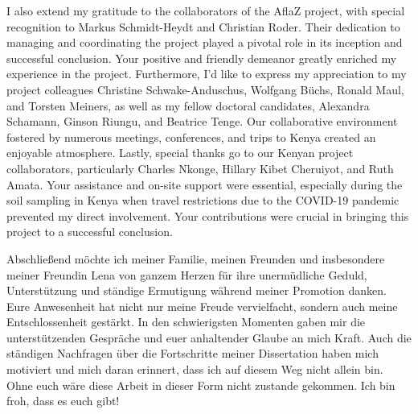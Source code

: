 \begin{acknowledgements}
I also extend my gratitude to the collaborators of the AflaZ project, with special recognition to Markus Schmidt-Heydt and Christian Roder. Their dedication to managing and coordinating the project played a pivotal role in its inception and successful conclusion. Your positive and friendly demeanor greatly enriched my experience in the project. Furthermore, I'd like to express my appreciation to my project colleagues Christine Schwake-Anduschus, Wolfgang Büchs, Ronald Maul, and Torsten Meiners, as well as my fellow doctoral candidates, Alexandra Schamann, Ginson Riungu, and Beatrice Tenge. Our collaborative environment fostered by numerous meetings, conferences, and trips to Kenya created an enjoyable atmosphere. Lastly, special thanks go to our Kenyan project collaborators, particularly Charles Nkonge, Hillary Kibet Cheruiyot, and Ruth Amata. Your assistance and on-site support were essential, especially during the soil sampling in Kenya when travel restrictions due to the COVID-19 pandemic prevented my direct involvement. Your contributions were crucial in bringing this project to a successful conclusion.


Abschließend möchte ich meiner Familie, meinen Freunden und insbesondere meiner Freundin Lena von ganzem Herzen für ihre unermüdliche Geduld, Unterstützung und ständige Ermutigung während meiner Promotion danken. Eure Anwesenheit hat nicht nur meine Freude vervielfacht, sondern auch meine Entschlossenheit gestärkt. In den schwierigsten Momenten gaben mir die unterstützenden Gespräche und euer anhaltender Glaube an mich Kraft. Auch die ständigen Nachfragen über die Fortschritte meiner Dissertation haben mich motiviert und mich daran erinnert, dass ich auf diesem Weg nicht allein bin. Ohne euch wäre diese Arbeit in dieser Form nicht zustande gekommen. Ich bin froh, dass es euch gibt!

\end{acknowledgements}